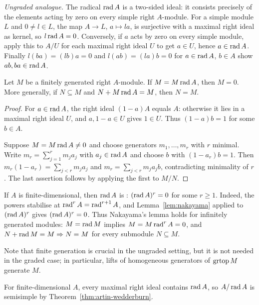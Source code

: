 \begin{advanced}
\emph{Ungraded analogue.}
The radical $\operatorname{rad}\nolimits A$ is a two-sided ideal: it consists precisely of the elements acting by zero on every simple right $A$-module.
For a simple module $L$ and $0\neq l\in L$, the map $A\to L$, $a\mapsto la$, is surjective with a maximal right ideal as kernel, so $l\operatorname{rad}\nolimits A=0$.
Conversely, if $a$ acts by zero on every simple module, apply this to $A/U$ for each maximal right ideal $U$ to get $a\in U$, hence $a\in\operatorname{rad}\nolimits A$.
Finally $l(ba)=(lb)a=0$ and $l(ab)=(la)b=0$ for $a\in\operatorname{rad}\nolimits A$, $b\in A$ show $ab,ba\in\operatorname{rad}\nolimits A$.

\begin{lemma}\label{lem:nakayama}
Let $M$ be a finitely generated right $A$-module.
If $M=M\operatorname{rad}\nolimits A$, then $M=0$.
More generally, if $N\subseteq M$ and $N+M\operatorname{rad}\nolimits A=M$, then $N=M$.
\end{lemma}

\begin{proof}
For $a\in \operatorname{rad}\nolimits A$, the right ideal $(1-a)A$ equals $A$: otherwise it lies in a maximal right ideal $U$, and $a,1-a\in U$ gives $1\in U$.
Thus $(1-a)b=1$ for some $b\in A$.

Suppose $M=M\operatorname{rad}\nolimits A\neq0$ and choose generators $m_1,\ldots,m_r$ with $r$ minimal.
Write $m_r=\sum_{j=1}^r m_j a_j$ with $a_j\in \operatorname{rad}\nolimits A$ and choose $b$ with $(1-a_r)b=1$.
Then $m_r(1-a_r)=\sum_{j<r}m_j a_j$ and $m_r=\sum_{j<r}m_j a_j b$, contradicting minimality of $r$.
The last assertion follows by applying the first to $M/N$.
\end{proof}

\begin{remark}\label{rem:nakayama-finite-dimensional}
If $A$ is finite-dimensional, then $\operatorname{rad}\nolimits A$ is : $(\operatorname{rad}\nolimits A)^r=0$ for some $r\geq1$.
Indeed, the powers stabilise at $\operatorname{rad}\nolimits^r A=\operatorname{rad}\nolimits^{r+1} A$, and Lemma~\ref{lem:nakayama} applied to $(\operatorname{rad}\nolimits A)^r$ gives $(\operatorname{rad}\nolimits A)^r=0$.
Thus Nakayama's lemma holds for infinitely generated modules: $M=\operatorname{rad}\nolimits M$ implies $M=M\operatorname{rad}\nolimits^r A=0$, and $N+\operatorname{rad}\nolimits M=M\Rightarrow N=M$ for every submodule $N\subseteq M$.
\end{remark}

\begin{remark}
Note that finite generation is crucial in the ungraded setting, but it is not needed in the graded case; in particular, lifts of homogeneous generators of $\operatorname{grtop}\nolimits M$ generate $M$.
\end{remark}

For finite-dimensional $A$, every maximal right ideal contains $\operatorname{rad}\nolimits A$, so $A/\operatorname{rad}\nolimits A$ is semisimple by Theorem~\ref{thm:artin-wedderburn}.


\end{advanced}
